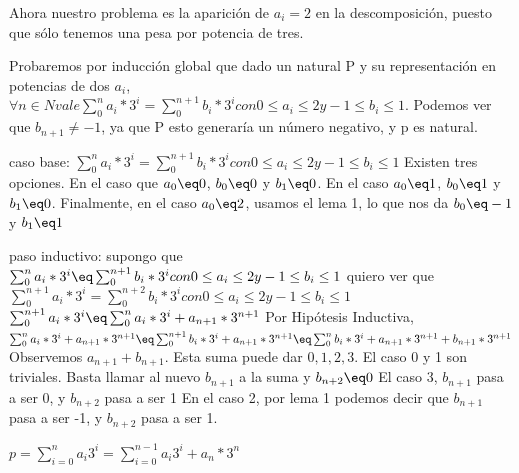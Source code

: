 \documentclass[spanish,12pt]{article}
\begin{document}
Ahora nuestro problema es la aparición de $a_i=2$ en la descomposición, puesto que sólo tenemos una pesa por potencia de tres.

Probaremos por inducción global  que dado un natural P y su representación en potencias de dos $a_{i}$, $ \forall n \in N vale  \sum_{0}^{n}{a_{i}*3^{i}}= \sum_{0}^{n+1}{b_{i}*3^{i}} con 0\leq a_{i} \leq 2 y -1 \leq b_{i} \leq 1$. Podemos ver que $b_{n+1}\neq -1$, ya que P esto generaría un número negativo, y p es natural.

caso base:  
$\sum_{0}^{n}{a_{i}*3^{i}}= \sum_{0}^{n+1}{b_{i}*3^{i}} con 0\leq a_{i} \leq 2 y -1 \leq b_{i} \leq 1$
Existen tres opciones. En el caso que $a_{0} \eq 0$, $b_{0} \eq 0$ y $b_{1} \eq 0$.
En el caso $a_{0} \eq 1$, $b_{0} \eq 1$ y $b_{1} \eq 0$.
Finalmente, en el caso $a_{0} \eq 2$, usamos el lema 1, lo que nos da $b_{0} \eq -1$ y $b_{1} \eq 1$

paso inductivo:
 supongo que $\sum_{0}^{n}{a_{i}*3^{i}} \eq \sum_{0}^{n+1}{b_{i}*3^{i}} con 0\leq a_{i} \leq 2 y -1 \leq b_{i} \leq 1$
 quiero ver que $\sum_{0}^{n+1}{a_{i}*3^{i}}= \sum_{0}^{n+2}{b_{i}*3^{i}} con 0\leq a_{i} \leq 2 y -1 \leq b_{i} \leq 1$
\\
$\sum_{0}^{n+1}{a_{i}*3^{i}} \eq \sum_{0}^{n}{a_{i}*3^{i}} + a_{n+1}*3^{n+1}$
Por Hipótesis Inductiva, $ \sum_{0}^{n}{a_{i}*3^{i}} + a_{n+1}*3^{n+1} \eq \sum_{0}^{n+1}{b_{i}*3^{i}} + a_{n+1}*3^{n+1} \eq \sum_{0}^{n}{b_{i}*3^{i}} + a_{n+1}*3^{n+1} + b_{n+1}*3^{n+1} $
Observemos $a_{n+1} + b_{n+1}$. Esta suma puede dar $0,1,2,3$.
El caso 0 y 1 son triviales. Basta llamar al nuevo $b_{n+1}$ a la suma y $b_{n+2} \eq 0$
El caso 3, $b_{n+1}$ pasa a ser 0, y $b_{n+2}$ pasa a ser 1
En el caso 2, por lema 1 podemos decir que $b_{n+1}$ pasa a ser -1, y $b_{n+2}$ pasa a ser 1.




$p= \sum_{i=0}^{n}{a_i 3^{i}} =  \sum_{i=0}^{n-1}{a_i 3^{i}} + a_n*3^{n}$ 
\end{document}
